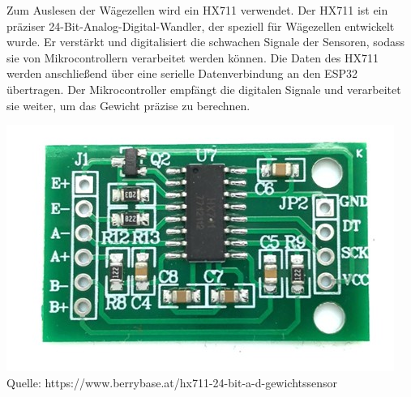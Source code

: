 \documentclass[ngerman,12pt,a4paper]{article}
\begin{document}
		Zum Auslesen der Wägezellen wird ein HX711 verwendet. Der HX711 ist ein präziser 24-Bit-Analog-Digital-Wandler, der speziell für Wägezellen entwickelt wurde. Er verstärkt und digitalisiert die schwachen Signale der Sensoren, sodass sie von Mikrocontrollern verarbeitet werden können. Die Daten des HX711 werden anschließend über eine serielle Datenverbindung an den ESP32 übertragen. Der Mikrocontroller empfängt die digitalen Signale und verarbeitet sie weiter, um das Gewicht präzise zu berechnen.
		\begin{center}
			\begin{minipage}{0.7\textwidth}
				\centering
				\includegraphics[width=\textwidth]{Pictures/hx711}
				\label{fig:hx711}
				\vspace{-3pt}
				{\small Quelle: {https://www.berrybase.at/hx711-24-bit-a-d-gewichtssensor}}
			\end{minipage}
		\end{center}
		
\end{document}
